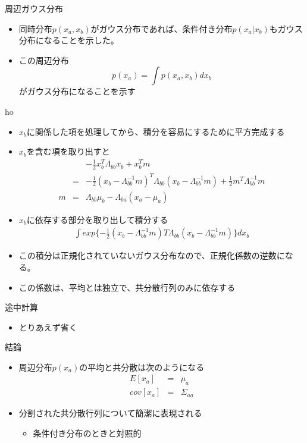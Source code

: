\begin{frame}{周辺ガウス分布}
\begin{itemize}
 \item 同時分布$p(x_a,x_b)$がガウス分布であれば、条件付き分布$p(x_a|x_b)$もガウス分布になることを示した。
 \item この周辺分布
\begin{equation}
 p(x_a) = \int p(x_a,x_b)dx_b
\end{equation}
			 がガウス分布になることを示す
\end{itemize}
\end{frame}

\begin{frame}{ho}
\begin{itemize}
 \item $x_b$に関係した項を処理してから、積分を容易にするために平方完成する
\item $x_b$を含む項を取り出すと
			\begin{eqnarray}
			 &&-\frac{1}{2}x^T_b\Lambda_{bb}x_b+x^T_bm \\
				&=& -\frac{1}{2}(x_b-\Lambda_{bb}^{-1}m)^T\Lambda_{bb}(x_b-\Lambda_{bb}^{-1}m) + \frac{1}{2}m^T\Lambda_{bb}^{-1}m \\
				m &=& \Lambda_{bb}\mu_b - \Lambda_{ba}(x_a-\mu_a)
			\end{eqnarray}
\end{itemize}
\end{frame}

\begin{frame}
 \begin{itemize}
	\item $x_b$に依存する部分を取り出して積分する
				\begin{eqnarray}
				 \int exp\{-\frac{1}{2}(x_b-\Lambda_{bb}^{-1}m)T\Lambda_{bb}(x_b-\Lambda_{bb}^{-1}m)\}dx_b
				\end{eqnarray}
	\item この積分は正規化されていないガウス分布なので、正規化係数の逆数になる。
	\item この係数は、平均とは独立で、共分散行列のみに依存する
 \end{itemize}
\end{frame}


\begin{frame}{途中計算}
\begin{itemize}
 \item とりあえず省く
\end{itemize}
\end{frame}

\begin{frame}{結論}
\begin{itemize}
 \item 周辺分布$p(x_a)$の平均と共分散は次のようになる
			\begin{eqnarray}
			 E[x_a] &=&  \mu_a\\
			 cov[x_a]&=&\Sigma_{aa}
			\end{eqnarray}
 \item 分割された共分散行列について簡潔に表現される
			 \begin{itemize}
				\item 条件付き分布のときと対照的
			 \end{itemize}
\end{itemize}
\end{frame}
